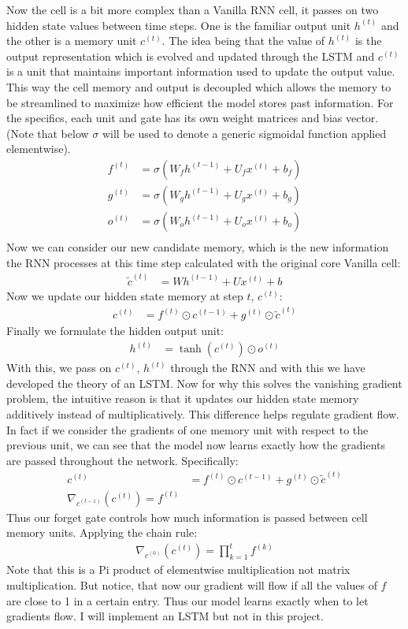 \documentclass[12pt]{article}
\begin{document}
Now the cell is a bit more complex than a Vanilla RNN cell, it passes on two hidden state values between time steps.
One is the familiar output unit $h^{(t)}$ and the other is a memory unit $c^{(t)}$. The idea being
that the value of $h^{(t)}$ is the output representation which is evolved and updated through the LSTM and
$c^{(t)}$ is a unit that maintains important information used to update the output value. This way the cell
memory and output is decoupled which allows the memory to be streamlined to maximize how efficient the model
stores past information. For the specifics, each unit and gate has its own weight matrices and bias vector. (Note
that below $\sigma$ will be used to denote a generic sigmoidal function applied elementwise).
\begin{align*}
    f^{(t)} &= \sigma(W_fh^{(t-1)} + U_fx^{(t)} + b_f) \\
    g^{(t)} &= \sigma(W_gh^{(t-1)} + U_gx^{(t)} + b_g) \\
    o^{(t)} &=\sigma(W_oh^{(t-1)} + U_ox^{(t)} + b_o) \\
\end{align*}
Now we can consider our new candidate memory, which is the new information the RNN processes at this time
step calculated with the original core Vanilla cell:
\begin{align*}
    \tilde{c}^{(t)} &=  Wh^{(t-1)} + Ux^{(t)} + b
\end{align*}
Now we update our hidden state memory at step $t$, $c^{(t)}$:
\begin{align*}
    c^{(t)} &= f^{(t)} \odot c^{(t-1)} + g^{(t)} \odot \tilde{c}^{(t)}
\end{align*}
Finally we formulate the hidden output unit:
\begin{align*}
    h^{(t)} &= \tanh(c^{(t)}) \odot o^{(t)}
\end{align*}
With this, we pass on $c^{(t)}$, $h^{(t)}$ through the RNN and with this we have developed the theory of an LSTM.
Now for why this solves the vanishing gradient problem, the intuitive reason is that it updates our hidden state
memory additively instead of multiplicatively. This difference helps regulate gradient flow. In fact if we consider
the gradients of one memory unit with respect to the previous unit, we can see that the model now learns
exactly how the gradients are passed throughout the network. Specifically:
\begin{align*}
    c^{(t)} &= f^{(t)} \odot c^{(t-1)} + g^{(t)} \odot \tilde{c}^{(t)} \\
    \nabla_{c^{(t-1)}}(c^{(t)}) = f^{(t)}
\end{align*}
Thus our forget gate controls how much information is passed between cell memory units. Applying the chain rule:
\begin{align*}
     \nabla_{c^{(0)}}(c^{(t)}) = \prod_{k=1}^{t}f^{(k)}
\end{align*}
Note that this is a Pi product of elementwise multiplication not matrix multiplication. But notice, that
now our gradient will flow if all the values of $f$ are close to 1 in a certain entry. Thus our model learns
exactly when to let gradients flow. I will implement an LSTM but not in this project.
\end{document}
